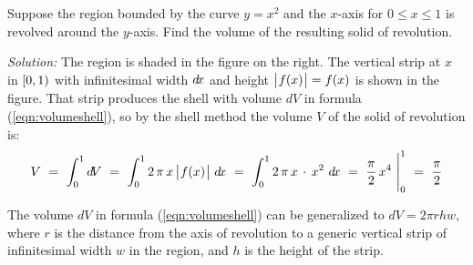 \begin{exmp}
\noindent Suppose the region bounded by the curve $y=x^2$ and the $x$-axis
for $0 \le x \le 1$ is revolved around the $y$-axis. Find the
volume of the resulting solid of revolution.\vspace{0.5mm}
\par\noindent\emph{Solution:} The region is shaded in the figure on the right.
The vertical strip at $x$ in $\lbrack 0,1 )$ with infinitesimal width $d\!x$ and
height $\bigl\lvert\mspace{1mu}f(x)\mspace{1mu}\bigr\rvert=f(x)$ is shown in the figure. That strip produces the shell
with volume $d\!V$ in formula (\ref{eqn:volumeshell}), so by the shell method
the volume $V$ of the solid of revolution is:
\[
V ~=~ \int_0^1 d\!V ~=~ \int_0^1 2\,\pi\,x\,\bigl\lvert\mspace{1mu}f(x)\mspace{1mu}\bigr\rvert~d\!x ~=~
\int_0^1 2\,\pi\,x\,\cdot\,x^2~d\!x ~=~ \frac{\pi}{2}\,x^4~\Biggr|_0^1 ~=~
\frac{\pi}{2}
\]
\end{exmp}
\divider
\newpage
The volume $d\!V$ in formula (\ref{eqn:volumeshell}) can be generalized to
$d\!V = 2 \pi r h w$, where $r$ is the distance from the axis of
revolution to a generic vertical strip of infinitesimal width $w$ in the region,
and $h$ is the height of the strip.
